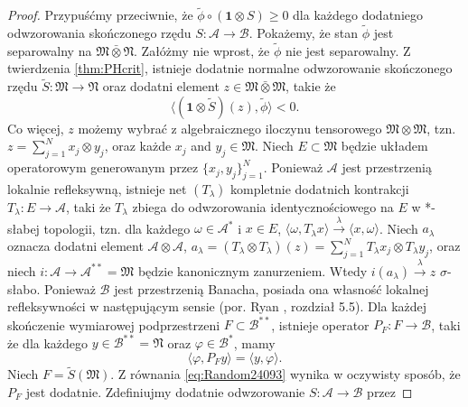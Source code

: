\begin{proof}
Przypuśćmy przeciwnie, że $\tilde{\phi} \circ (\mathbf{1} \otimes S) \geq 0$
dla każdego dodatniego odwzorowania skończonego rzędu
$S: \mathcal{A} \rightarrow \mathcal{B}$.
Pokażemy, że stan $\tilde{\phi}$
jest separowalny na $\mathfrak{M} \bar{\otimes} \mathfrak{N}$.
Załóżmy nie wprost, że $\tilde{\phi}$ nie jest separowalny.
Z twierdzenia \ref{thm:PHcrit},
istnieje dodatnie normalne odwzorowanie skończonego rzędu
$\tilde{S}: \mathfrak{M} \rightarrow \mathfrak{N}$
oraz dodatni element $z \in \mathfrak{M} \bar{\otimes} \mathfrak{M}$,
takie że
\begin{equation}
\label{eq:Random6347}
\langle(\mathbf{1} \otimes \tilde{S})(z), \tilde{\phi}\rangle < 0.
\end{equation}
Co więcej, $z$ możemy wybrać z algebraicznego iloczynu tensorowego
$\mathfrak{M} \otimes \mathfrak{M}$,
tzn. $z = \sum_{j=1}^{N} x_{j} \otimes y_{j}$,
oraz każde $x_{j}$ and $y_{j} \in \mathfrak{M}$.
Niech $E \subset \mathfrak{M}$ będzie układem operatorowym generowanym przez
$\{ x_{j}, y_{j}\}_{j=1}^{N}$.
Ponieważ $\mathcal{A}$ jest przestrzenią lokalnie refleksywną,
istnieje net $(T_{\lambda})$ kompletnie dodatnich kontrakcji
$T_{\lambda}: E \rightarrow \mathcal{A}$,
taki że $T_{\lambda}$ zbiega do odwzorowania identycznościowego na $E$
w *-słabej topologii, tzn.
dla każdego $\omega \in \mathcal{A}^{*}$ i $x \in E$,
$ \langle \omega, T_{\lambda}x \rangle\stackrel{\lambda}{\rightarrow}
\langle x, \omega \rangle$.
Niech $a_{\lambda}$ oznacza dodatni element $\mathcal{A} \otimes \mathcal{A}$,
$a_{\lambda} = (T_{\lambda} \otimes T_{\lambda}) (z) =
\sum_{j=1}^{N} T_{\lambda} x_{j} \otimes T_{\lambda} y_{j}$,
oraz niech
$i: \mathcal{A} \rightarrow \mathcal{A}^{**}=\mathfrak{M}$
będzie kanonicznym zanurzeniem.
Wtedy $i(a_{\lambda}) \stackrel{\lambda}{\rightarrow} z$
$\sigma$-słabo.
Ponieważ $\mathcal{B}$ jest przestrzenią Banacha,
posiada ona własność lokalnej refleksywności w następującym sensie
(por. Ryan \cite{Ryan2002}, rozdział 5.5).
Dla każdej skończenie wymiarowej podprzestrzeni $F \subset \mathcal{B}^{**}$,
istnieje operator $P_{F}: F \rightarrow \mathcal{B}$,
taki że dla każdego $y \in \mathcal{B}^{**} = \mathfrak{N}$
oraz $\varphi \in \mathcal{B}^{*}$, mamy
\begin{equation}
\label{eq:Random24093}
\langle \varphi, P_{F}y \rangle =\langle y, \varphi \rangle.
\end{equation}
Niech $F = \tilde{S}(\mathfrak{M})$.
Z równania \eqref{eq:Random24093} wynika w oczywisty sposób, że
$P_{F}$ jest dodatnie.
Zdefiniujmy dodatnie odwzorowanie $S: \mathcal{A} \rightarrow \mathcal{B}$ przez

\end{proof}
